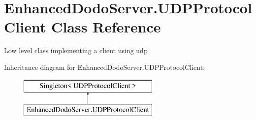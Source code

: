 \hypertarget{class_enhanced_dodo_server_1_1_u_d_p_protocol_client}{}\section{Enhanced\+Dodo\+Server.\+U\+D\+P\+Protocol\+Client Class Reference}
\label{class_enhanced_dodo_server_1_1_u_d_p_protocol_client}


Low level class implementing a client using udp  


Inheritance diagram for Enhanced\+Dodo\+Server.\+U\+D\+P\+Protocol\+Client\+:\begin{figure}[H]
\begin{center}
\leavevmode
\includegraphics[height=2.000000cm]{class_enhanced_dodo_server_1_1_u_d_p_protocol_client}
\end{center}
\end{figure}
